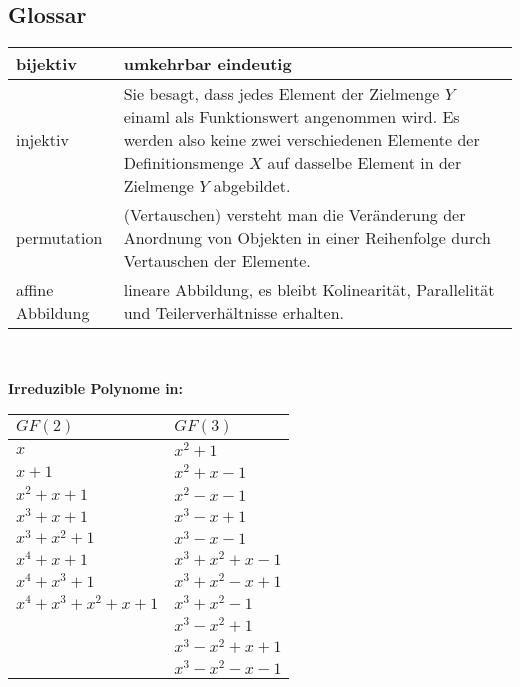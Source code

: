 \subsection{Glossar}
\begin{minipage}{12.5cm}
\begin{tabular}[]{|l |p{9cm}| }
	\hline
	bijektiv			&	umkehrbar eindeutig		\\
	\hline
	injektiv			&	Sie besagt, dass jedes Element der Zielmenge $Y$ einaml als Funktionswert angenommen wird.
							Es werden also keine zwei verschiedenen Elemente der Definitionsmenge $X$ auf dasselbe Element in 
							der Zielmenge $Y$ abgebildet.		\\
	\hline
	permutation			&	(Vertauschen) versteht man die Ver\"anderung der Anordnung von Objekten in einer Reihenfolge
							durch Vertauschen der Elemente.			\\
	\hline
	affine Abbildung	&	lineare Abbildung, es bleibt Kolinearit\"at, Parallelit\"at und Teilerverh\"altnisse erhalten.	 \\
	
	\hline
\end{tabular}\\

\end{minipage}
\begin{minipage}{6cm}
\textbf{Irreduzible Polynome in:}\\
\begin{tabular}{l l}
	$GF(2)$				&	$GF(3)$\\
	\hline
	$x$					&	$x^2+1$\\
	$x+1$				&	$x^2+x-1$\\
	$x^2+x+1$			&	$x^2-x-1$\\
	$x^3+x+1$			&	$x^3-x+1$\\
	$x^3+x^2+1$			&	$x^3-x-1$\\
	$x^4+x+1$			&	$x^3+x^2+x-1$\\
	$x^4+x^3+1$			&	$x^3+x^2-x+1$\\
	$x^4+x^3+x^2+x+1$	&	$x^3+x^2-1$\\ 
						&	$x^3-x^2+1$\\ 
						&	$x^3-x^2+x+1$\\ 
						&	$x^3-x^2-x-1$\\ 
\end{tabular}
\end{minipage}






